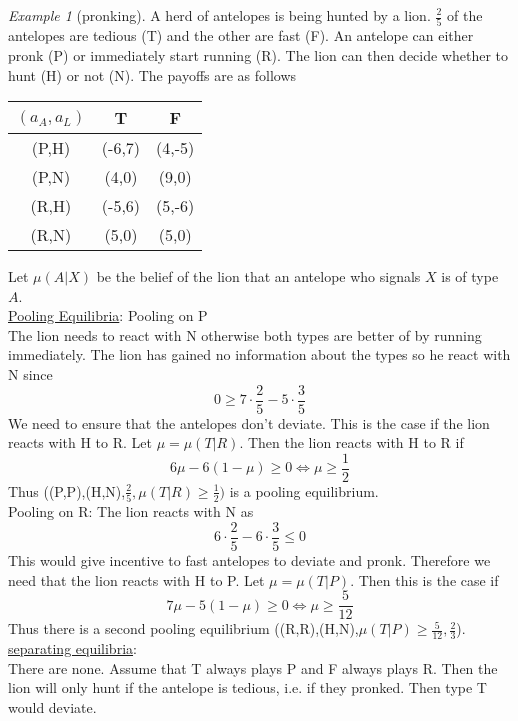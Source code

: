\documentclass[a4paper, 12pt]{article}
\theoremstyle{plain}
\theoremstyle{definition}
\theoremstyle{lemma}
\theoremstyle{remark}
\theoremstyle{corollary}
\theoremstyle{example}
\newtheorem{example}[theorem]{Example}
\begin{document}
	\begin{example}[pronking]
		A herd of antelopes is being hunted by a lion. $\frac{2}{5}$ of the antelopes are tedious (T) and the other are fast (F). An antelope can either pronk (P) or immediately start running (R). The lion can then decide whether to hunt (H) or not (N). The payoffs are as follows 
		\begin{center}
			\begin{table}[h]
				\begin{tabular}{|c|c|c|}
					\hline
					$(a_A,a_L)$ & T & F\\
					\hline
					(P,H) & (-6,7) & (4,-5)\\
					\hline
					(P,N) & (4,0) & (9,0)\\
					\hline
					(R,H) & (-5,6) & (5,-6)\\
					\hline
					(R,N) & (5,0) & (5,0)\\
					\hline
				\end{tabular}
			\end{table}
		\end{center}
		Let $\mu(A|X)$ be the belief of the lion that an antelope who signals $X$ is of type $A$.\\
		\underline{Pooling Equilibria}: Pooling on P\\
		The lion needs to react with N otherwise both types are better of by running immediately. The lion has gained no information about the types so he react with N since \[0 \geq 7\cdot \frac{2}{5} - 5\cdot \frac{3}{5}\]
		We need to ensure that the antelopes don't deviate. This is the case if the lion reacts with H to R. Let $\mu = \mu(T|R)$. Then the lion reacts with H to R if \[6\mu - 6(1-\mu) \geq 0 \Leftrightarrow \mu \geq \frac{1}{2}\]
		Thus ((P,P),(H,N),$\frac{2}{5},\mu(T|R)\geq\frac{1}{2})$ is a pooling equilibrium.\\
		Pooling on R:
		The lion reacts with N as \[6\cdot \frac{2}{5} - 6\cdot \frac{3}{5} \leq 0\] This would give incentive to fast antelopes to deviate and pronk. Therefore we need that the lion reacts with H to P. Let $\mu = \mu(T|P)$. Then this is the case if \[7\mu - 5(1-\mu) \geq 0 \Leftrightarrow \mu \geq \frac{5}{12}\] Thus there is a second pooling equilibrium ((R,R),(H,N),$\mu(T|P)\geq \frac{5}{12},\frac{2}{3}$).\\
		\underline{separating equilibria}:\\
		There are none. Assume that T always plays P and F always plays R. Then the lion will only hunt if the antelope is tedious, i.e. if they pronked. Then type T would deviate.\\

\end{example}
\end{document}

